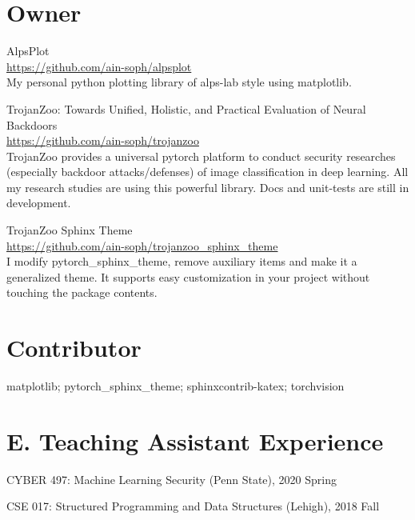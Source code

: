 \documentclass{resume}
\begin{document}
\begin{resume}
\section{Owner}
\vspace{8pt}

AlpsPlot \\
\url{https://github.com/ain-soph/alpsplot} \\
My personal python plotting library of alps-lab style using matplotlib.

TrojanZoo: Towards Unified, Holistic, and Practical Evaluation of Neural Backdoors \\
\url{https://github.com/ain-soph/trojanzoo} \\
TrojanZoo provides a universal pytorch platform to conduct security researches (especially backdoor attacks/defenses) of image classification in deep learning. All my research studies are using this powerful library. Docs and unit-tests are still in development.

TrojanZoo Sphinx Theme \\
\url{https://github.com/ain-soph/trojanzoo_sphinx_theme} \\
I modify pytorch\_sphinx\_theme, remove auxiliary items and make it a generalized theme. It supports easy customization in your project without touching the package contents.

\section{Contributor}
\vspace{8pt}

matplotlib; pytorch\_sphinx\_theme; sphinxcontrib-katex; torchvision


\vspace{0.2in} 
\section{E. Teaching Assistant Experience}
\vspace{8pt}

CYBER 497: Machine Learning Security (Penn State), 2020 Spring

CSE 017: Structured Programming and Data Structures (Lehigh), 2018 Fall


\end{resume} 
\end{document}
